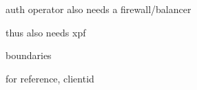 \documentclass{beamer}
\begin{document}
\begin{frame}{auth operator also needs a firewall/balancer}
\end{frame}

\begin{frame}{thus also needs xpf}
\end{frame}

\begin{frame}{boundaries}
\end{frame}

\begin{frame}{for reference, clientid}
\end{frame}
\end{document}
